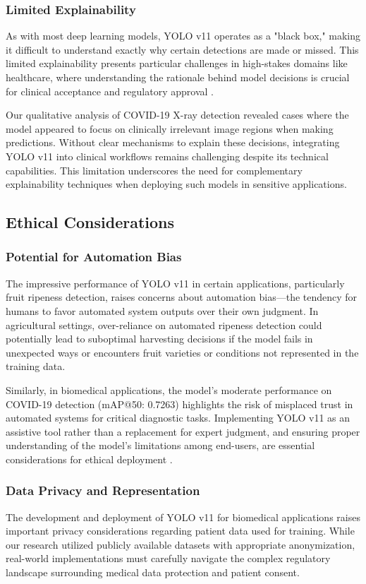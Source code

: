 \begin{multicols}{2}
\subsubsection{Limited Explainability}
As with most deep learning models, YOLO v11 operates as a "black box," making it difficult to understand exactly why certain detections are made or missed. This limited explainability presents particular challenges in high-stakes domains like healthcare, where understanding the rationale behind model decisions is crucial for clinical acceptance and regulatory approval \citep{Chan2020}.

Our qualitative analysis of COVID-19 X-ray detection revealed cases where the model appeared to focus on clinically irrelevant image regions when making predictions. Without clear mechanisms to explain these decisions, integrating YOLO v11 into clinical workflows remains challenging despite its technical capabilities. This limitation underscores the need for complementary explainability techniques when deploying such models in sensitive applications.

\subsection{Ethical Considerations}

\subsubsection{Potential for Automation Bias}
The impressive performance of YOLO v11 in certain applications, particularly fruit ripeness detection, raises concerns about automation bias—the tendency for humans to favor automated system outputs over their own judgment. In agricultural settings, over-reliance on automated ripeness detection could potentially lead to suboptimal harvesting decisions if the model fails in unexpected ways or encounters fruit varieties or conditions not represented in the training data.

Similarly, in biomedical applications, the model's moderate performance on COVID-19 detection (mAP@50: 0.7263) highlights the risk of misplaced trust in automated systems for critical diagnostic tasks. Implementing YOLO v11 as an assistive tool rather than a replacement for expert judgment, and ensuring proper understanding of the model's limitations among end-users, are essential considerations for ethical deployment \citep{ChanCell2020}.

\subsubsection{Data Privacy and Representation}
The development and deployment of YOLO v11 for biomedical applications raises important privacy considerations regarding patient data used for training. While our research utilized publicly available datasets with appropriate anonymization, real-world implementations must carefully navigate the complex regulatory landscape surrounding medical data protection and patient consent.


\end{multicols}
